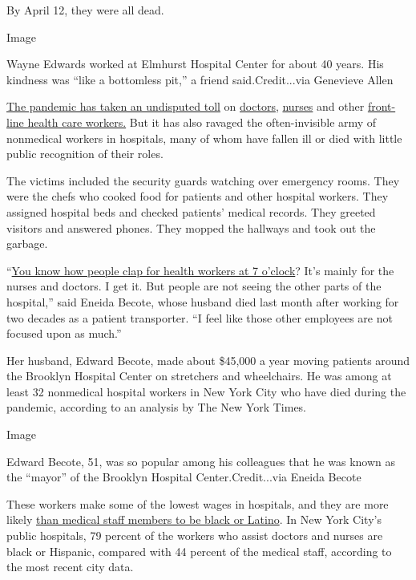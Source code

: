 By April 12, they were all dead.

Image

Wayne Edwards worked at Elmhurst Hospital Center for about 40 years. His
kindness was ``like a bottomless pit,'' a friend said.Credit...via
Genevieve Allen

\href{https://www.nytimes3xbfgragh.onion/2020/03/30/nyregion/ny-coronavirus-doctors-sick.html}{The
pandemic has taken an undisputed toll} on
\href{https://www.nytimes3xbfgragh.onion/2020/04/27/nyregion/new-york-city-doctor-suicide-coronavirus.html}{doctors},
\href{https://www.nytimes3xbfgragh.onion/2020/03/26/nyregion/nurse-dies-coronavirus-mount-sinai.html}{nurses}
and other
\href{https://www.nytimes3xbfgragh.onion/2020/04/15/nyregion/coronavirus-woodhull-madhvi-aya-dead.html}{front-line
health care workers.} But it has also ravaged the often-invisible army
of nonmedical workers in hospitals, many of whom have fallen ill or died
with little public recognition of their roles.

The victims included the security guards watching over emergency rooms.
They were the chefs who cooked food for patients and other hospital
workers. They assigned hospital beds and checked patients' medical
records. They greeted visitors and answered phones. They mopped the
hallways and took out the garbage.

``\href{https://www.nytimes3xbfgragh.onion/interactive/2020/04/10/nyregion/nyc-7pm-cheer-thank-you-coronavirus.html}{You
know how people clap for health workers at 7 o'clock}? It's mainly for
the nurses and doctors. I get it. But people are not seeing the other
parts of the hospital,'' said Eneida Becote, whose husband died last
month after working for two decades as a patient transporter. ``I feel
like those other employees are not focused upon as much.''

Her husband, Edward Becote, made about \$45,000 a year moving patients
around the Brooklyn Hospital Center on stretchers and wheelchairs. He
was among at least 32 nonmedical hospital workers in New York City who
have died during the pandemic, according to an analysis by The New York
Times.

Image

Edward Becote, 51, was so popular among his colleagues that he was known
as the ``mayor'' of the Brooklyn Hospital Center.Credit...via Eneida
Becote

These workers make some of the lowest wages in hospitals, and they are
more likely
\href{https://www.nytimes3xbfgragh.onion/2020/04/08/nyregion/coronavirus-race-deaths.html}{than
medical staff members to be black or Latino}. In New York City's public
hospitals, 79 percent of the workers who assist doctors and nurses are
black or Hispanic, compared with 44 percent of the medical staff,
according to the most recent city data.

